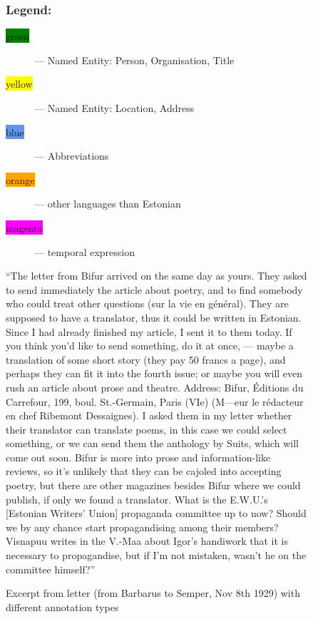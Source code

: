 \documentclass[runningheads]{llncs}
\begin{document}
\begin{figure}
\begin{minipage}{0.9\textwidth}
    \subsubsection{Legend:}
    \begin{description}
\item[\colorbox{Green}{green}] --- Named Entity: Person, Organisation, Title
\item[\colorbox{Yellow}{yellow}] --- Named Entity: Location, Address
\item[\colorbox{CornflowerBlue}{blue}] --- Abbreviations
\item[\colorbox{Orange}{orange}] --- other languages than Estonian
\item[\colorbox{Magenta}{magenta}] --- temporal expression
\end{description}
\end{minipage}
\begin{minipage}{0.9\textwidth}
  \vspace{14pt}
  ``The letter from Bifur arrived on the same day as yours. They asked to send immediately the article about poetry, and to find somebody who could treat other questions (sur la vie en g\'en\'eral). They are supposed to have a translator, thus it could be written in Estonian. Since I had already finished my article, I sent it to them today. If you think you’d like to send something, do it at once, --- maybe a translation of some short story (they pay 50 francs a page), and perhaps they can fit it into the fourth issue; or maybe you will even rush an article about prose and theatre. Address: Bifur, \'Editions du Carrefour, 199, boul. St.-Germain, Paris (VIe) (M---eur le r\'edacteur en chef Ribemont Dessaignes). I asked them in my letter whether their translator can translate poems, in this case we could select something, or we can send them the anthology by Suits, which will come out soon. Bifur is more into prose and information-like reviews, so it's unlikely that they can be cajoled into accepting poetry, but there are other magazines besides Bifur where we could publish, if only we found a translator. What is the E.W.U.'s [Estonian Writers' Union] propaganda committee up to now? Should we by any chance start propagandising among their members? Visnapuu writes in the V.-Maa about Igor's handiwork that it is necessary to propagandise, but if I'm not mistaken, wasn't he on the committee himself?''
  \end{minipage}
  \caption{Excerpt from letter (from Barbarus to Semper, Nov 8th 1929) with different annotation types}\label{fig1}
\end{figure}
\end{document}
